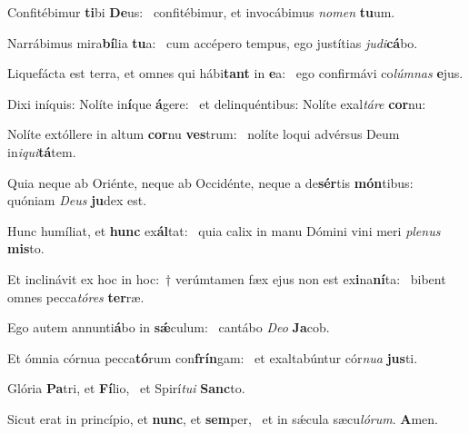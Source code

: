 \item Confitébimur \textbf{ti}bi \textbf{De}us:~\psstar{} confitébimur, et invocábimus \textit{nomen} \textbf{tu}um.
\item Narrábimus mira\textbf{bí}lia \textbf{tu}a:~\psstar{} cum accépero tempus, ego justítias \textit{judi}\textbf{cá}bo.
\item Liquefácta est terra, et omnes qui hábi\textbf{tant} in \textbf{e}a:~\psstar{} ego confirmávi co\textit{lúmnas} \textbf{e}jus.
\item Dixi iníquis: Nolíte in\textbf{í}que \textbf{á}gere:~\psstar{} et delinquéntibus: Nolíte exal\textit{táre} \textbf{cor}nu:
\item Nolíte extóllere in altum \textbf{cor}nu \textbf{ves}trum:~\psstar{} nolíte loqui advérsus Deum in\textit{iqui}\textbf{tá}tem.
\item Quia neque ab Oriénte, neque ab Occidénte, neque a de\textbf{sér}tis \textbf{món}tibus:~\psstar{} quóniam \textit{Deus} \textbf{ju}dex est.
\item Hunc humíliat, et \textbf{hunc} ex\textbf{ál}tat:~\psstar{} quia calix in manu Dómini vini meri \textit{plenus} \textbf{mis}to.
\item Et inclinávit ex hoc in hoc:~† verúmtamen fæx ejus non est ex\textbf{i}na\textbf{ní}ta:~\psstar{} bibent omnes pecca\textit{tóres} \textbf{ter}ræ.
\item Ego autem annunti\textbf{á}bo in \textbf{sǽ}culum:~\psstar{} cantábo \textit{Deo} \textbf{Ja}cob.
\item Et ómnia córnua pecca\textbf{tó}rum con\textbf{frín}gam:~\psstar{} et exaltabúntur cór\textit{nua} \textbf{jus}ti.
\item Glória \textbf{Pa}tri, et \textbf{Fí}lio,~\psstar{} et Spirí\textit{tui} \textbf{Sanc}to.
\item Sicut erat in princípio, et \textbf{nunc}, et \textbf{sem}per,~\psstar{} et in sǽcula sæcu\textit{lórum}. \textbf{A}men.

